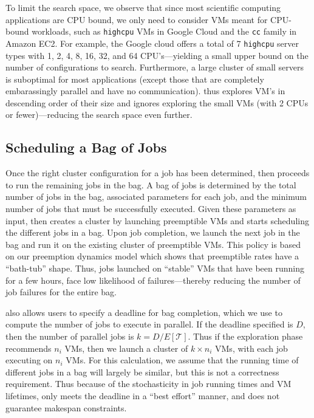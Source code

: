
To limit the search space, we observe that since most scientific computing applications are CPU bound, we only need to consider VMs meant for CPU-bound workloads, such as \texttt{highcpu} VMs in Google Cloud and the \texttt{cc} family in Amazon EC2.
For example, the Google cloud offers a total of 7 \texttt{highcpu} server types with 1, 2, 4, 8, 16, 32, and 64 CPU's---yielding a small upper bound on the number of configurations to search. 
Furthermore, a large cluster of small servers is suboptimal for most applications (except those that are completely embarassingly parallel and have no communication).
\sysname thus explores VM's in descending order of their size and ignores exploring the small VMs (with 2 CPUs or fewer)---reducing the search space even further. 


\vspace*{\subsecspace}
\subsection{Scheduling a Bag of Jobs}


Once the right cluster configuration for a job has been determined, \sysname then proceeds to run the remaining jobs in the bag.
A bag of jobs is determined by the total number of jobs in the bag, associated parameters for each job, and the minimum number of jobs that must be successfully executed.  
Given these parameters as input, \sysname then creates a cluster by launching preemptible VMs and starts scheduling the different jobs in a bag.
Upon job completion, we launch the next job in the bag and run it on the existing cluster of preemptible VMs.
This policy is based on our preemption dynamics model which shows that preemptible rates have a ``bath-tub'' shape.
Thus, jobs launched on ``stable'' VMs that have been running for a few hours, face low likelihood of failures---thereby reducing the number of job failures for the entire bag. 

\sysname also allows users to specify a deadline for bag completion, which we use to compute the number of jobs to execute in parallel.
If the deadline specified is $D$, then the number of parallel jobs is $k=D/E[\mathcal{T}]$.
Thus if the exploration phase recommends $n_i$ VMs, then we launch a cluster of $k\times n_i$ VMs, with each job executing on $n_i$ VMs. 
For this calculation, we assume that the running time of different jobs in a bag will largely be similar, but this is not a correctness requirement.
Thus because of the stochasticity in job running times and VM lifetimes, \sysname only meets the deadline in a ``best effort'' manner, and does not guarantee makespan constraints. 

